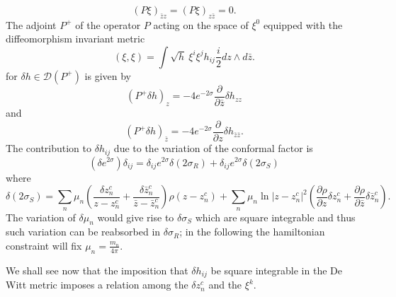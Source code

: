\documentclass[a4paper,12pt]{article}
\begin{document}
\begin{equation}
(P\xi)_{\bar zz}= (P\xi)_{z\bar z}=0.
\end{equation} 
The adjoint $P^+$ of the operator $P$ acting on the space of $\xi^0$ 
equipped with the diffeomorphism invariant metric 
\begin{equation}
(\xi, \xi)=\int \sqrt h~ \xi^i \xi^j h_{ij} \frac{i}{2} dz \wedge d\bar z.
\end{equation}
for $\delta h\in \mathcal{D}(P^+)$ is given by 
\begin{equation}
(P^+ \delta h)_z = -4 e^{-2\sigma}\frac{\partial}{\partial \bar z}
\delta h_{zz}
\end{equation}
and
\begin{equation}
(P^+ \delta h)_{\bar z} = 
-4e^{-2\sigma}\frac{\partial}{\partial z} \delta h_{\bar z\bar z}.
\end{equation}
The contribution to $\delta h_{ij}$ due to the variation of the
conformal factor is
\begin{equation}
(\delta e^{2\sigma})\delta_{ij}=\delta_{ij} e^{2\sigma}\delta(2\sigma_R)+
\delta_{ij} e^{2\sigma}\delta(2\sigma_S)
\end{equation}
where
\begin{equation}\label{de_sigmaS}
\delta(2\sigma_S)=\sum_n\mu_n\left(\frac{\delta z^c_n}{z-z^c_n}+
\frac{\delta \bar z^c_n}{\bar z-\bar z^c_n}\right)\rho(z-z^c_n)
+\sum_n\mu_n\ln|z-z^c_n|^2 \left(\frac{\partial \rho}{\partial z}\delta z^c_n
+\frac{\partial \rho}{\partial \bar z}\delta \bar z^c_n\right).
\end{equation}
The variation of $\delta \mu_n$ would give rise to $\delta\sigma_S$
which are square integrable and thus such variation can be
reabsorbed in $\delta \sigma_R$; in the following 
the hamiltonian constraint will fix $\mu_n=\frac{m_n}{4\pi}$.

We shall see now that the  
imposition that $\delta h_{ij}$ be square integrable in the De Witt
metric imposes a relation among the $\delta z^c_n$ and the $\xi^{k}$.
\end{document}
